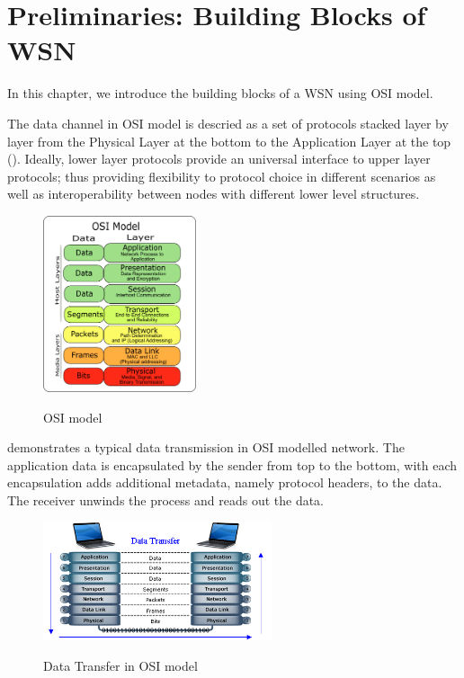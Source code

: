 \chapter{Preliminaries: Building Blocks of WSN} \label{Chp: Building Blocks}

In this chapter, we introduce the building blocks of a WSN using OSI model\cite{OSI}.

The data channel in OSI model is descried as a set of protocols stacked layer by layer from the Physical Layer at the bottom to the Application Layer at the top (). Ideally, lower layer protocols provide an universal  interface to upper layer protocols; thus providing flexibility to protocol choice in different scenarios as well as interoperability between nodes with different lower level structures.

\begin{figure}[th!]
	\centering
	{
		\includegraphics[width=0.4\textwidth,]{fig/Osi-model-jb.png}
	}
	\caption{OSI model} \label{fig: OSI model}
\end{figure}

 demonstrates a typical data transmission in OSI modelled network. The application data is encapsulated by the sender from top to the bottom, with each encapsulation adds additional metadata, namely protocol headers, to the data. The receiver unwinds the process and reads out the data.

\begin{figure}[th!]
	\centering
	{
		\includegraphics[width=0.6\textwidth,]{fig/osi-model.png}
	}
	\caption{Data Transfer in OSI model} \label{fig: OSI channel}
\end{figure}

